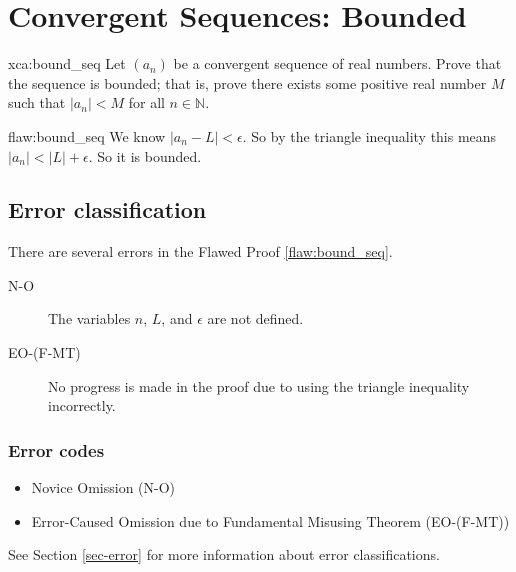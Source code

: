 \section{Convergent Sequences: Bounded}

\begin{xca}{xca:bound_seq}
Let $(a_n)$ be a convergent sequence of real numbers. Prove that the sequence is bounded; that is, prove there exists some positive real number $M$ such that $|a_n| < M$ for all $n \in \mathbb{N}$.
\end{xca}

\begin{flaw}{flaw:bound_seq} %
We know $|a_n - L| < \epsilon$. So by the triangle inequality this means $|a_n| < |L| + \epsilon$. So it is bounded.

\end{flaw}

\clearpage
\subsection{Error classification}


There are several errors
 in the Flawed Proof \ref{flaw:bound_seq}.

 \begin{description}
    \item[N-O] The variables $n$, $L$, and $\epsilon$ are not defined.
    \item[EO-(F-MT)] No progress is made in the proof due to using the triangle inequality incorrectly.

 	
 \end{description}


\subsubsection{Error codes}
\begin{itemize}
    \item Novice Omission (N-O)
	\item Error-Caused Omission due to Fundamental Misusing Theorem (EO-(F-MT))
\end{itemize}
See Section \ref{sec-error} for more information about error classifications.

